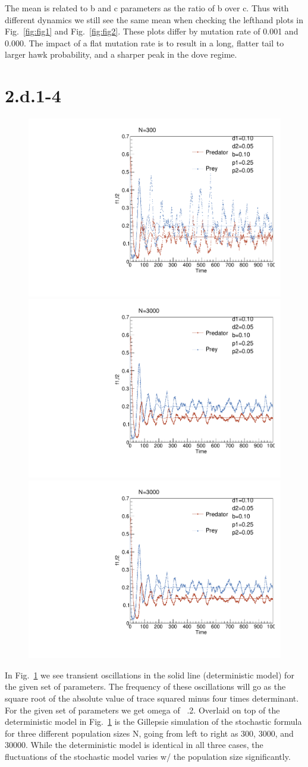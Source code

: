 \documentclass{article}
\begin{document}
The mean is related to b and c parameters as the ratio of b over c. Thus with different dynamics we still see the same mean when checking the lefthand plots in Fig.~\ref{fig:fig1} and Fig.~\ref{fig:fig2}. These plots differ by mutation rate of 0.001 and 0.000. The impact of a flat mutation rate is to result in a long, flatter tail to larger hawk probability, and a sharper peak in the dove regime.

\section{2.d.1-4}

\begin{figure}[H]
    \centering
    \includegraphics[width=.32\textwidth]{stochIBM_NTot300_p10p25_20171201.pdf} 
    \includegraphics[width=.32\textwidth]{stochIBM_NTot3000_p10p25_20171201.pdf}  
    \includegraphics[width=.32\textwidth]{stochIBM_NTot3000_p10p25_20171201.pdf} 
    \caption{}
    \label{fig:fig3}
\end{figure}

In Fig.~\ref{fig:fig3} we see transient oscillations in the solid line (deterministic model) for the given set of parameters. The frequency of these oscillations will go as the square root of the absolute value of trace squared minus four times determinant. For the given set of parameters we get omega of ~.2. Overlaid on top of the deterministic model in Fig.~\ref{fig:fig3} is the Gillepsie simulation of the stochastic formula for three different population sizes N, going from left to right as 300, 3000, and 30000. While the deterministic model is identical in all three cases, the fluctuations of the stochastic model varies w/ the population size significantly.
\end{document}

